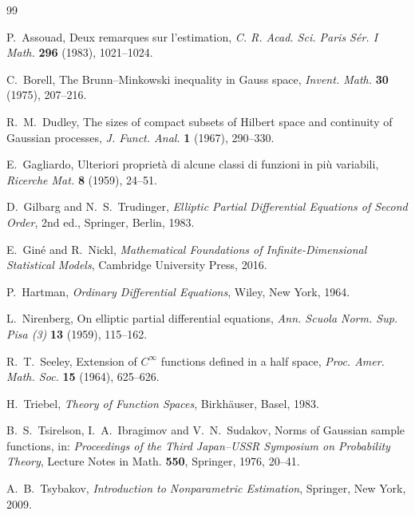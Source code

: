 \documentclass[11pt]{article}
\theoremstyle{definition}
\theoremstyle{remark}
\begin{document}
\begin{thebibliography}{99}

 P.~Assouad, Deux remarques sur l'estimation, \emph{C. R. Acad. Sci. Paris S\'er. I Math.} \textbf{296} (1983), 1021--1024.

 C.~Borell, The Brunn--Minkowski inequality in Gauss space, \emph{Invent. Math.} \textbf{30} (1975), 207--216.

 R.~M.~Dudley, The sizes of compact subsets of Hilbert space and continuity of Gaussian processes, \emph{J. Funct. Anal.} \textbf{1} (1967), 290--330.

 E.~Gagliardo, Ulteriori propriet\`a di alcune classi di funzioni in pi\`u variabili, \emph{Ricerche Mat.} \textbf{8} (1959), 24--51.

 D.~Gilbarg and N.~S.~Trudinger, \emph{Elliptic Partial Differential Equations of Second Order}, 2nd ed., Springer, Berlin, 1983.

 E.~Gin\'e and R.~Nickl, \emph{Mathematical Foundations of Infinite-Dimensional Statistical Models}, Cambridge University Press, 2016.

 P.~Hartman, \emph{Ordinary Differential Equations}, Wiley, New York, 1964.

 L.~Nirenberg, On elliptic partial differential equations, \emph{Ann. Scuola Norm. Sup. Pisa (3)} \textbf{13} (1959), 115--162.

 R.~T.~Seeley, Extension of $C^\infty$ functions defined in a half space, \emph{Proc. Amer. Math. Soc.} \textbf{15} (1964), 625--626.

 H.~Triebel, \emph{Theory of Function Spaces}, Birkh\"auser, Basel, 1983.

 B.~S.~Tsirelson, I.~A.~Ibragimov and V.~N.~Sudakov, Norms of Gaussian sample functions, in: \emph{Proceedings of the Third Japan--USSR Symposium on Probability Theory}, Lecture Notes in Math. \textbf{550}, Springer, 1976, 20--41.

 A.~B.~Tsybakov, \emph{Introduction to Nonparametric Estimation}, Springer, New York, 2009.

\end{thebibliography}
\end{document}
